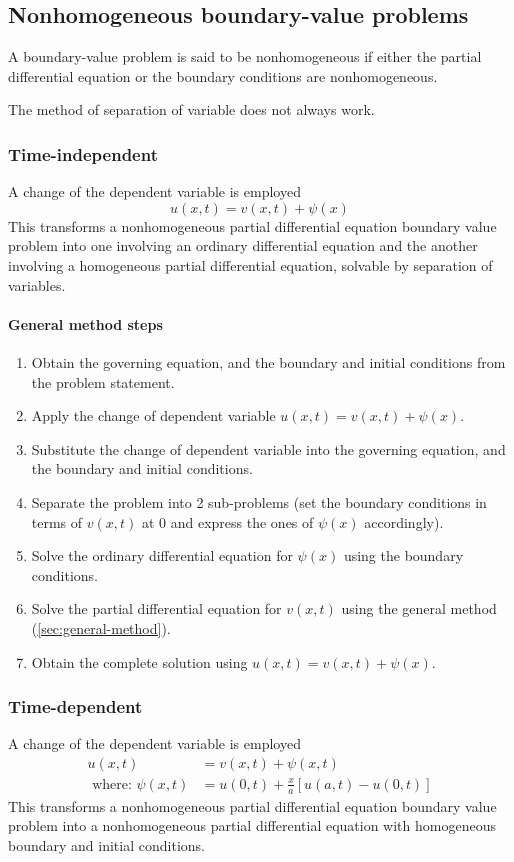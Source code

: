 \documentclass[10pt, twocolumn]{article}
\begin{document}
\subsection{Nonhomogeneous boundary-value problems}
A boundary-value problem is said to be nonhomogeneous if either the partial differential equation or the boundary conditions are nonhomogeneous.

The method of separation of variable does not always work.


\subsubsection{Time-independent}
A change of the dependent variable is employed
\[
  u(x,t) = v(x,t) + \psi(x)
\]
This transforms a nonhomogeneous partial differential equation boundary value problem into one involving an ordinary differential equation and the another involving a homogeneous partial differential equation, solvable by separation of variables.


\paragraph{General method steps}
\begin{enumerate}
  \item Obtain the governing equation, and the boundary and initial conditions from the problem statement.
  \item Apply the change of dependent variable \(u(x,t) = v(x,t) + \psi(x)\).
  \item Substitute the change of dependent variable into the governing equation, and the boundary and initial conditions.
  \item Separate the problem into 2 sub-problems (set the boundary conditions in terms of \(v(x,t)\) at 0 and express the ones of \(\psi(x)\) accordingly).
  \item Solve the ordinary differential equation for \(\psi(x)\) using the boundary conditions.
  \item Solve the partial differential equation for \(v(x,t)\) using the general method (\vref{sec:general-method}).
  \item Obtain the complete solution using \(u(x,t) = v(x,t) + \psi(x)\).
\end{enumerate}


\subsubsection{Time-dependent}
A change of the dependent variable is employed
\begin{align*}
  u(x,t)                    & = v(x,t) + \psi(x,t)                                  \\
  \text{ where: } \psi(x,t) & = u(0,t) + \frac{x}{a} \left[ u(a,t) - u(0,t) \right]
\end{align*}
This transforms a nonhomogeneous partial differential equation boundary value problem into a nonhomogeneous partial differential equation with homogeneous boundary and initial conditions.
\end{document}
